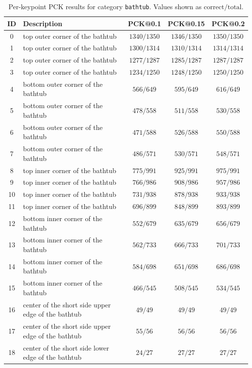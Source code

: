\begin{table}[h]
\centering
\small
\caption{Per-keypoint PCK results for category \texttt{bathtub}. Values shown as $\text{correct}/\text{total}$.}
\label{tab:pck_bathtub}
\begin{tabular}{cl ccc}
\toprule
ID & Description & PCK@0.1 & PCK@0.15 & PCK@0.2 \\
\midrule
0 & top outer corner of the bathtub & $1340/1350$ & $1346/1350$ & $1350/1350$ \\
1 & top outer corner of the bathtub & $1300/1314$ & $1310/1314$ & $1314/1314$ \\
2 & top outer corner of the bathtub & $1277/1287$ & $1285/1287$ & $1287/1287$ \\
3 & top outer corner of the bathtub & $1234/1250$ & $1248/1250$ & $1250/1250$ \\
4 & bottom outer corner of the bathtub & $566/649$ & $595/649$ & $616/649$ \\
5 & bottom outer corner of the bathtub & $478/558$ & $511/558$ & $530/558$ \\
6 & bottom outer corner of the bathtub & $471/588$ & $526/588$ & $550/588$ \\
7 & bottom outer corner of the bathtub & $486/571$ & $530/571$ & $548/571$ \\
8 & top inner corner of the bathtub & $775/991$ & $925/991$ & $975/991$ \\
9 & top inner corner of the bathtub & $766/986$ & $908/986$ & $957/986$ \\
10 & top inner corner of the bathtub & $731/938$ & $878/938$ & $933/938$ \\
11 & top inner corner of the bathtub & $696/899$ & $848/899$ & $893/899$ \\
12 & bottom inner corner of the bathtub & $552/679$ & $635/679$ & $656/679$ \\
13 & bottom inner corner of the bathtub & $562/733$ & $666/733$ & $701/733$ \\
14 & bottom inner corner of the bathtub & $584/698$ & $651/698$ & $686/698$ \\
15 & bottom inner corner of the bathtub & $466/545$ & $508/545$ & $534/545$ \\
16 & center of the short side upper edge of the bathtub & $49/49$ & $49/49$ & $49/49$ \\
17 & center of the short side upper edge of the bathtub & $55/56$ & $56/56$ & $56/56$ \\
18 & center of the short side lower edge of the bathtub & $24/27$ & $27/27$ & $27/27$ \\

\end{tabular}
\end{table}
